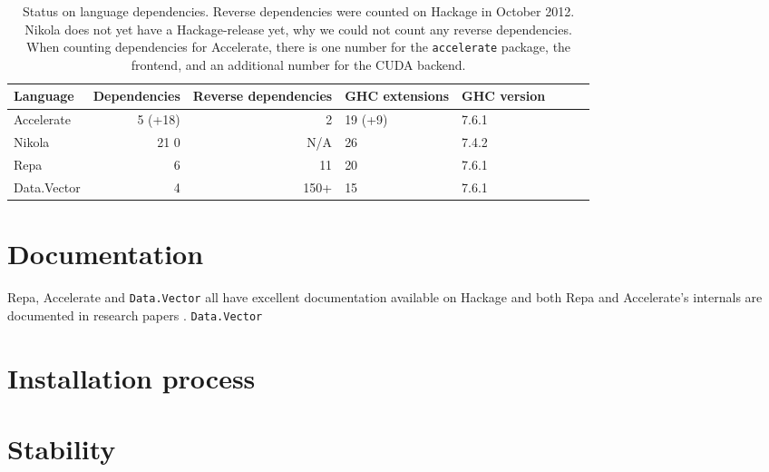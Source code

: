\begin{table}
  \centering
\begin{adjustbox}{minipage=1.3\textwidth,margin=0pt \smallskipamount,center}
  \begin{tabular}{l|rrllllr}
    Language    & Dependencies & Reverse dependencies & GHC extensions & GHC version \\ \hline
    Accelerate  & 5 (+18)      & 2                    & 19 (+9)        & 7.6.1 \\
    Nikola      & 21 0         & N/A                  & 26             & 7.4.2 \\
    Repa        & 6            & 11                   & 20             & 7.6.1 \\
    Data.Vector & 4            & 150+                 & 15             & 7.6.1 \\
  \end{tabular}
\end{adjustbox}
\caption{Status on language dependencies. Reverse dependencies were counted on Hackage in October 2012. 
  Nikola does not yet have a Hackage-release yet, why we could not count any reverse dependencies.
  When counting dependencies for Accelerate, there is one number for 
  the \texttt{accelerate} package, the frontend, and an additional number for the CUDA backend.}
  \label{tab:dependency_status}
\end{table}


\section{Documentation}
Repa, Accelerate and \texttt{Data.Vector} all have excellent
documentation available on Hackage and both Repa and Accelerate's
internals are documented in research papers
. \texttt{Data.Vector}

\section{Installation process}



\section{Stability}

